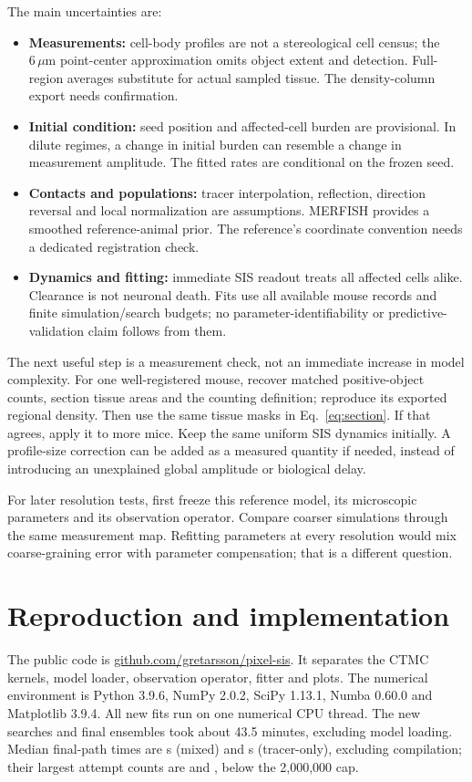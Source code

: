 \documentclass[10pt]{article}
\newcommand{\um}{\,\mu\mathrm{m}}\newcommand{\E}{\mathbb{E}}
\begin{document}
The main uncertainties are:
\begin{itemize}
\item \textbf{Measurements:} cell-body profiles are not a stereological cell census; the $6\um$ point-center approximation omits object extent and detection. Full-region averages substitute for actual sampled tissue. The density-column export needs confirmation.
\item \textbf{Initial condition:} seed position and affected-cell burden are provisional. In dilute regimes, a change in initial burden can resemble a change in measurement amplitude. The fitted rates are conditional on the frozen seed.
\item \textbf{Contacts and populations:} tracer interpolation, reflection, direction reversal and local normalization are assumptions. MERFISH provides a smoothed reference-animal prior. The reference's coordinate convention needs a dedicated registration check.
\item \textbf{Dynamics and fitting:} immediate SIS readout treats all affected cells alike. Clearance is not neuronal death. Fits use all available mouse records and finite simulation/search budgets; no parameter-identifiability or predictive-validation claim follows from them.
\end{itemize}

The next useful step is a measurement check, not an immediate increase in model complexity. For one well-registered mouse, recover matched positive-object counts, section tissue areas and the counting definition; reproduce its exported regional density. Then use the same tissue masks in Eq.~\ref{eq:section}. If that agrees, apply it to more mice. Keep the same uniform SIS dynamics initially. A profile-size correction can be added as a measured quantity if needed, instead of introducing an unexplained global amplitude or biological delay.

For later resolution tests, first freeze this reference model, its microscopic parameters and its observation operator. Compare coarser simulations through the same measurement map. Refitting parameters at every resolution would mix coarse-graining error with parameter compensation; that is a different question.

\section{Reproduction and implementation}
The public code is \href{https://github.com/gretarsson/pixel-sis}{github.com/gretarsson/pixel-sis}. It separates the CTMC kernels, model loader, observation operator, fitter and plots. The numerical environment is Python 3.9.6, NumPy 2.0.2, SciPy 1.13.1, Numba 0.60.0 and Matplotlib 3.9.4. All new fits run on one numerical CPU thread. The new searches and final ensembles took about 43.5 minutes, excluding model loading. Median final-path times are \MixedSeconds{} s (mixed) and \TracerSeconds{} s (tracer-only), excluding compilation; their largest attempt counts are \MixedAttempts{} and \TracerAttempts{}, below the 2,000,000 cap.
\end{document}
